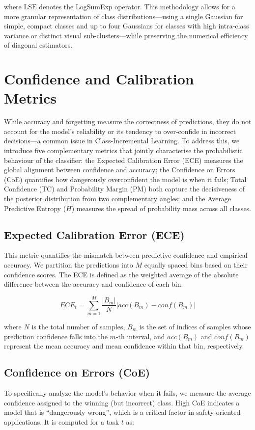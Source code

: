 where $\text{LSE}$ denotes the LogSumExp operator. This methodology allows for a more granular representation of class distributions—using a single Gaussian for simple, compact classes and up to four Gaussians for classes with high intra-class variance or distinct visual sub-clusters—while preserving the numerical efficiency of diagonal estimators.

\section{Confidence and Calibration Metrics}
\label{sec:method:metrics}

While accuracy and forgetting measure the correctness of predictions, they do not account for the model's reliability or its tendency to over-confide in incorrect decisions---a common issue in Class-Incremental Learning. To address this, we introduce five complementary metrics that jointly characterise the probabilistic behaviour of the classifier: the Expected Calibration Error (ECE) measures the global alignment between confidence and accuracy; the Confidence on Errors (CoE) quantifies how dangerously overconfident the model is when it fails; Total Confidence (TC) and Probability Margin (PM) both capture the decisiveness of the posterior distribution from two complementary angles; and the Average Predictive Entropy ($H$) measures the spread of probability mass across all classes.

\subsection{Expected Calibration Error (ECE)}
This metric quantifies the mismatch between predictive confidence and empirical accuracy. We partition the predictions into $M$ equally spaced bins based on their confidence scores. The ECE is defined as the weighted average of the absolute difference between the accuracy and confidence of each bin:

\begin{equation}
	ECE_t = \sum_{m=1}^{M} \frac{|B_m|}{N} \left| acc(B_m) - conf(B_m) \right|\label{eq_ECE}
\end{equation}

where $N$ is the total number of samples, $B_m$ is the set of indices of samples whose prediction confidence falls into the $m$-th interval, and $acc(B_m)$ and $conf(B_m)$ represent the mean accuracy and mean confidence within that bin, respectively.

\subsection{Confidence on Errors (CoE)}
To specifically analyze the model's behavior when it fails, we measure the average confidence assigned to the winning (but incorrect) class. High CoE indicates a model that is ``dangerously wrong'', which is a critical factor in safety-oriented applications. It is computed for a task $t$ as:

